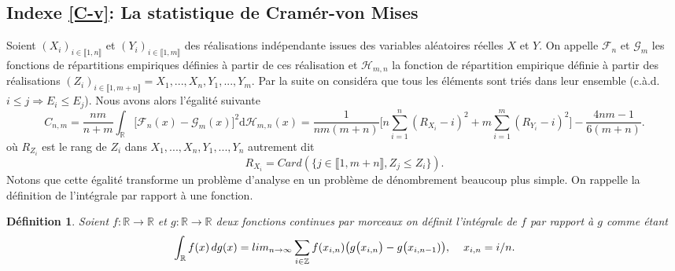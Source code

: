 \documentclass[a4paper,11pt]{article}
\newtheorem{definition}{Définition}
\begin{document}
\subsection{Indexe \ref{C-v}: La statistique de Cramér-von Mises}
\label{lemme Cramer-von Mise}
Soient $(X_i)_{i\in \llbracket 1,n \rrbracket}$ et $(Y_i)_{i\in \llbracket 1,m \rrbracket }$ des réalisations indépendante issues des variables aléatoires réelles $X$ et $Y$. On appelle $\mathcal{F}_{n}$ et $\mathcal{G}_{m}$ les fonctions de répartitions empiriques définies à partir de ces réalisation et $\mathcal{H}_{m,n}$ la fonction de répartition empirique définie à partir des réalisations $(Z_i)_{i\in \llbracket 1,m+n \rrbracket }=X_1,...,X_n,Y_1,...,Y_m$. Par la suite on considéra que tous les éléments sont triés dans leur ensemble (c.à.d. $i\leq j \Rightarrow E_i\leq E_j$). Nous avons alors l'égalité suivante
\begin{equation}
	C_{n,m}=\frac{nm}{n+m}\int_{\mathbb{R}}\big[ \mathcal{F}_{n}(x)-\mathcal{G}_{m}(x)\big]^{2} \mathrm{d} \mathcal{H}_{m,n}(x)=\frac{1}{nm(m+n)}\Big[ n\sum_{i=1}^{n}(R_{X_i}-i)^2+ m\sum_{i=1}^{m}(R_{Y_i}-i)^2\Big]-\frac{4nm-1}{6(m+n)}.
\end{equation}
	où $R_{Z_i}$ est le rang de $Z_i$ dans $X_1,...,X_n,Y_1,...,Y_n$ autrement dit 
	\[R_{X_i}=Card(\{j \in \llbracket 1,m+n \rrbracket , Z_j\leq Z_i\}).\] 
Notons que cette égalité transforme un problème d'analyse en un problème de dénombrement beaucoup plus simple. On rappelle la définition de l'intégrale par rapport à une fonction.
\begin{definition}
	Soient $f:\mathbb{R} \to \mathbb{R}$ et $g:\mathbb{R} \to \mathbb{R}$ deux fonctions continues par morceaux on définit l'intégrale de $f$ par rapport à $g$ comme étant
	\[\int_{\mathbb{R}}f(x)\, dg(x)=lim_{n\to\infty}\sum_{i \in \mathbb{Z}}f(x_{i,n})\big( g\big(x_{i,n}\big)-g\big(x_{i,n-1})\big),\hspace{4mm}x_{i,n}=i/n.\]
\end{definition}
\end{document}

